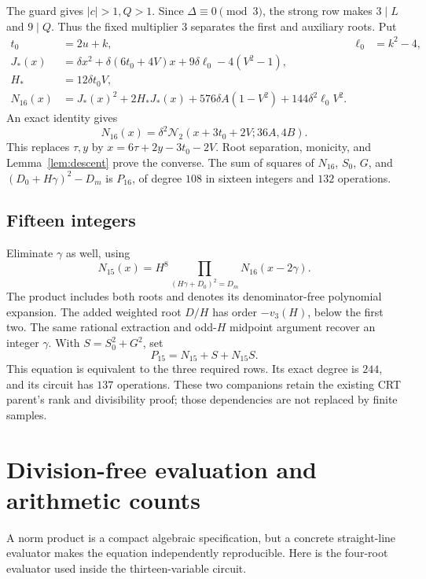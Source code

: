 \documentclass[11pt]{article}
\theoremstyle{definition}
\theoremstyle{remark}
\newcommand{\Norm}{\mathcal N}
\newcommand{\vp}{v_3}
\begin{document}
The guard gives \(|c|>1,Q>1\). Since \(\Delta\equiv0\pmod3\), the strong
row makes \(3\mid L\) and \(9\mid Q\). Thus the fixed multiplier \(3\)
separates the first and auxiliary roots. Put
\begin{align*}
 t_0&=2u+k,& \ell_0&=k^2-4,\\
 J_*(x)&=\delta x^2+\delta(6t_0+4V)x
                         +9\delta\ell_0-4(V^2-1),\\
 H_*&=12\delta t_0V,\\
 N_{16}(x)&=J_*(x)^2+2H_*J_*(x)
       +576\delta A(1-V^2)+144\delta^2\ell_0V^2.
\end{align*}
An exact identity gives
\[
 N_{16}(x)=\delta^2\Norm_2(x+3t_0+2V;36A,4B).
\]
This replaces \(\tau,y\) by \(x=6\tau+2y-3t_0-2V\).
Root separation, monicity, and Lemma~\ref{lem:descent} prove the converse.
The sum of squares of \(N_{16}\), \(S_0\), \(G\), and
\((D_0+H\gamma)^2-D_m\) is \(P_{16}\), of degree \(108\) in
sixteen integers and \(132\) operations.

\subsection{Fifteen integers}

Eliminate \(\gamma\) as well, using
\[
 N_{15}(x)=H^8
 \prod_{(H\gamma+D_0)^2=D_m}N_{16}(x-2\gamma).
\]
The product includes both roots and denotes its denominator-free
polynomial expansion. The added weighted root \(D/H\) has order
\(-\vp(H)\), below the first two. The same rational extraction and
odd-\(H\) midpoint argument recover an integer \(\gamma\).
With \(S=S_0^2+G^2\), set
\[
 P_{15}=N_{15}+S+N_{15}S.
\]
This equation is equivalent to the three required rows. Its exact degree
is \(244\), and its circuit has \(137\) operations. These two companions
retain the existing CRT parent's rank and divisibility proof; those
dependencies are not replaced by finite samples.

\section{Division-free evaluation and arithmetic counts}
\label{sec:evaluator}

A norm product is a compact algebraic specification, but a concrete
straight-line evaluator makes the equation independently reproducible.
Here is the four-root evaluator used inside the thirteen-variable circuit.
\end{document}
